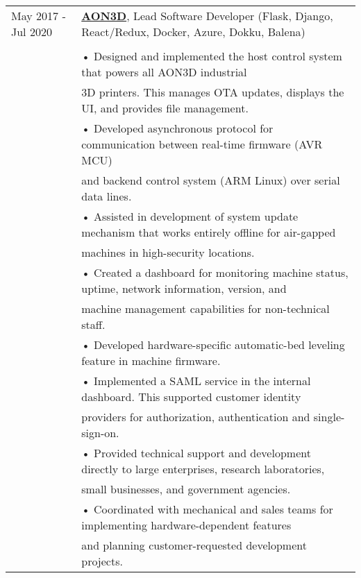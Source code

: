 \documentclass[10pt,notitlepage,oneside,draft]{article}
\begin{document}
\begin{flushleft}
  \normalsize
  \begin{tabular}{p{78pt} | l}
      \scriptsize May 2017 ‐ Jul 2020 & \textbf{\href{https://www.aon3d.com}{AON3D}}, Lead Software Developer (\footnotesize Flask, Django, React/Redux, Docker, Azure, Dokku, Balena)\\
    \\
    & • Designed and implemented the host control system that powers all AON3D industrial \\
    & \hspace{5pt} 3D printers. This manages OTA updates, displays the UI, and provides file management. \\
    & • Developed asynchronous protocol for communication between real-time firmware (AVR MCU) \\
    & \hspace{5pt} and backend control system (ARM Linux) over serial data lines. \\
    & • Assisted in development of system update mechanism that works entirely offline for air-gapped \\
    & \hspace{5pt} machines in high-security locations. \\
    & • Created a dashboard for monitoring machine status, uptime, network information, version, and \\
      & \hspace{5pt} machine management capabilities for non-technical staff. \\
    & • Developed hardware-specific automatic-bed leveling feature in machine firmware. \\
    & • Implemented a SAML service in the internal dashboard. This supported customer identity \\
    & \hspace{5pt} providers for authorization, authentication and single-sign-on. \\
    & • Provided technical support and development directly to large enterprises, research laboratories, \\
    & \hspace{5pt} small businesses, and government agencies. \\
    & • Coordinated with mechanical and sales teams for implementing hardware-dependent features \\
    & \hspace{5pt} and planning customer-requested development projects. \\
  \end{tabular}


\end{flushleft}
\end{document}
